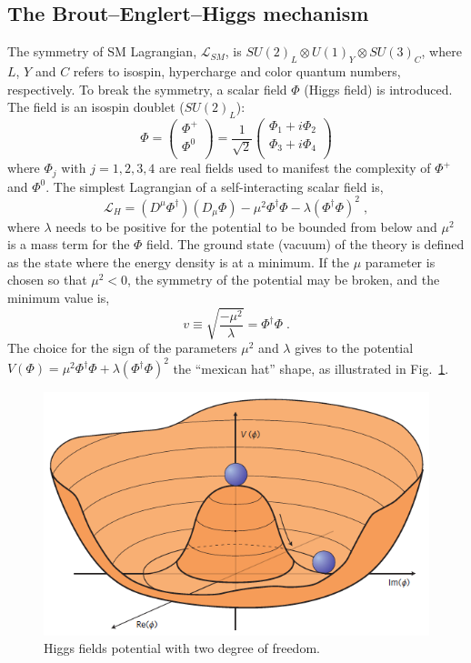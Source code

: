 \subsection*{The Brout–Englert–Higgs mechanism}
The symmetry of SM Lagrangian, $\mathcal{L}_{SM}$, is $SU(2)_L \otimes U(1)_Y \otimes SU(3)_C$, where $L$, $Y$ and $C$ refers to isospin, hypercharge and color quantum numbers, respectively. To break the symmetry,  a  scalar field $\Phi$ (Higgs field) is introduced. 
The field is an  isospin doublet ($SU(2)_L$):
\newline
$$
\Phi=
\left(
\begin{array}{c}
\Phi^+   \\
\Phi^0 \\
\end{array}
\right)
=\frac{1}{\sqrt{2}}
\left(
\begin{array}{c}
\Phi_1 + i\Phi_2   \\
\Phi_3 + i\Phi_4  \\
\end{array}
\right)
$$
\newline
where $\Phi_j$ with $j=1,2,3,4$ are real fields used to manifest the complexity of $\Phi^+$ and  $\Phi^0$. The simplest Lagrangian of a self-interacting scalar field is,
\begin{equation}
 \mathcal{L}_{H}= (D^{\mu} \Phi^{\dag})(D_{\mu} \Phi) -\mu^2 \Phi^{\dag}\Phi - \lambda(\Phi^{\dag}\Phi)^2 \; , \end{equation}
where $\lambda$ needs to be positive for the potential to be bounded from below and $\mu^2$
 is a mass term for the $\Phi$ field.
The ground state (vacuum) of the theory is defined as the state where the energy density is at a minimum.
If the $\mu$ parameter is chosen so that $\mu^2<0$, the symmetry of the potential may be broken,
and  the minimum value is,
\newline
\begin{equation}
v\equiv
\sqrt{\frac{-\mu^2}{\lambda}}=\Phi^{\dag}\Phi \; .
\label{min}
\end{equation}
The choice for the sign of the
parameters $\mu^2$ and $\lambda$ gives to the potential $V(\Phi)= \mu^2 \Phi^{\dag}\Phi + \lambda(\Phi^{\dag}\Phi)^2$ the ``mexican hat'' shape, as illustrated in Fig.~\ref{higgspotential}.
\begin{figure}
\centering
\includegraphics[scale= 0.4]{../Cap1/higgspotential}
\caption{Higgs fields potential with two degree of freedom.}
\label{higgspotential}
\end{figure}
